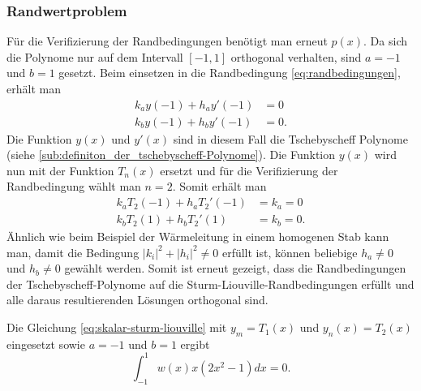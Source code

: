 \subsubsection*{Randwertproblem}
Für die Verifizierung der Randbedingungen benötigt man erneut $p(x)$.
Da sich die Polynome nur auf dem Intervall $[ -1,1 ]$ orthogonal verhalten, sind $a = -1$ und $b = 1$ gesetzt.
Beim einsetzen in die Randbedingung \eqref{eq:randbedingungen}, erhält man
\begin{equation}
\begin{aligned}
	k_a y(-1) + h_a y'(-1) &= 0\\
	k_b y(-1) + h_b y'(-1) &= 0.
\end{aligned} 
\end{equation}
Die Funktion $y(x)$ und $y'(x)$ sind in diesem Fall die Tschebyscheff Polynome (siehe \ref{sub:definiton_der_tschebyscheff-Polynome}).
Die Funktion $y(x)$ wird nun mit der Funktion $T_n(x)$ ersetzt und für die Verifizierung der Randbedingung wählt man $n=2$.
Somit erhält man
\begin{equation}
	\begin{aligned}
	k_a T_2(-1) + h_a T_{2}'(-1) &= k_a = 0\\
	k_b T_2(1) + h_b T_{2}'(1) &= k_b = 0.
	\end{aligned}
\end{equation}
Ähnlich wie beim Beispiel der Wärmeleitung in einem homogenen Stab kann man, damit die Bedingung $|k_i|^2 + |h_i|^2\ne 0$ erfüllt ist, können beliebige $h_a \ne 0$ und $h_b \ne 0$ gewählt werden.
Somit ist erneut gezeigt, dass die Randbedingungen der Tschebyscheff-Polynome auf die Sturm-Liouville-Randbedingungen erfüllt und alle daraus resultierenden Lösungen orthogonal sind.

\begin{beispiel}
	Die Gleichung \eqref{eq:skalar-sturm-liouville} mit $y_m = T_1(x)$ und $y_n(x) = T_2(x)$ eingesetzt sowie $a=-1$ und $b = 1$ ergibt
	\[
	\int_{-1}^{1} w(x) x (2x^2-1) dx = 0.
	\]
\end{beispiel}

 










